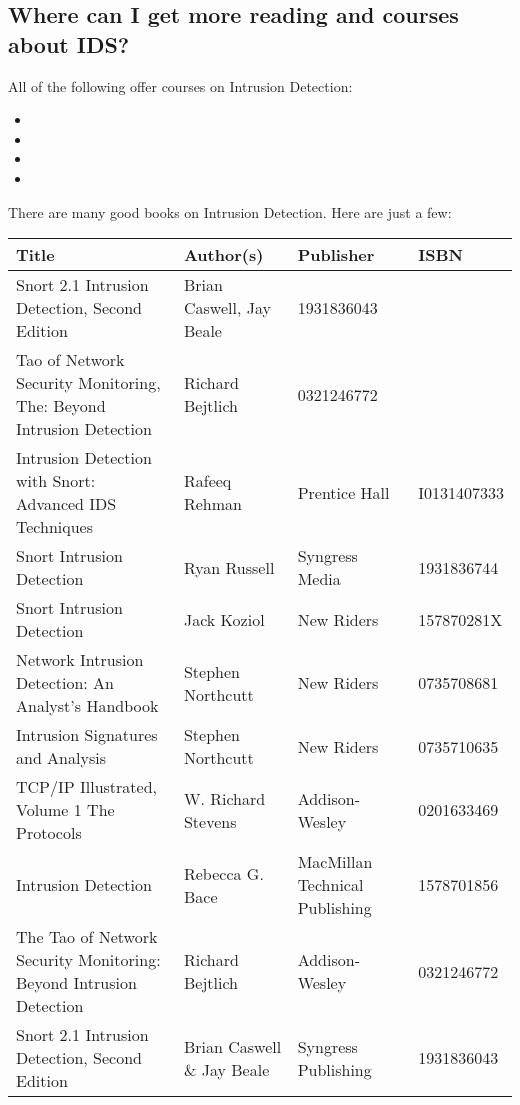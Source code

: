 \documentclass{article}
\begin{document}
\subsection{Where can I get more reading and courses about IDS?\label{courses}}

All of the following offer courses on Intrusion Detection:
\begin{itemize}
\item {} 
\item {} 
\item {}
\item {} 
\end{itemize}

There are many good books on Intrusion Detection. Here are just a few:

\begin{tabular}{|p{2in}|p{1.5in}|l|l|}
\hline
{\bf Title} & {\bf Author(s)} & {\bf Publisher} & {\bf ISBN}\\
\hline\hline
Snort 2.1 Intrusion Detection, Second Edition & Brian Caswell, Jay Beale & 1931836043 \\
\hline
Tao of Network Security Monitoring, The: Beyond Intrusion Detection & Richard Bejtlich & 0321246772 \\
\hline
Intrusion Detection with Snort: Advanced IDS Techniques & Rafeeq Rehman & Prentice Hall & I0131407333\\
\hline
Snort Intrusion Detection        &       Ryan Russell        & Syngress Media &  1931836744 \\
\hline
Snort Intrusion Detection        &        Jack Koziol        &   New Riders   &  157870281X\\
\hline
Network Intrusion Detection: An Analyst's Handbook & Stephen Northcutt & New Riders & 0735708681 \\
\hline
Intrusion Signatures and Analysis                 & Stephen Northcutt & New Riders & 0735710635 \\
\hline
TCP/IP Illustrated, Volume 1 The Protocols        & W. Richard Stevens & Addison-Wesley & 0201633469 \\
\hline
Intrusion Detection                               & Rebecca G. Bace    & MacMillan Technical Publishing & 1578701856 \\
\hline
The Tao of Network Security Monitoring: Beyond Intrusion Detection & Richard Bejtlich & Addison-Wesley & 0321246772 \\
\hline
Snort 2.1 Intrusion Detection, Second Edition & Brian Caswell \& Jay Beale & Syngress Publishing & 1931836043 \\
\hline
\end{tabular}
\end{document}
